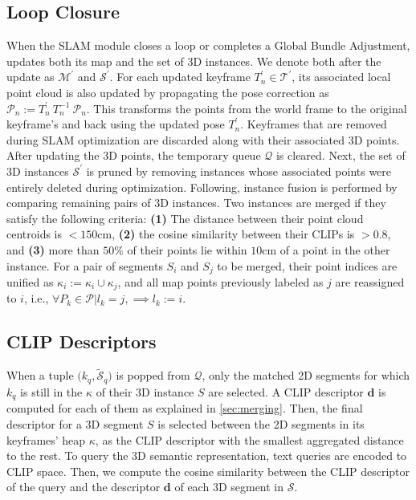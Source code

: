 \subsection{Loop Closure}
\label{sec:loop_closure}
%
When the SLAM module closes a loop or completes a Global Bundle Adjustment, \ours updates both its map and the set of 3D instances. We denote both after the update as \(\mathcal{M}^\prime\) and \(\mathcal{S}^\prime\).
For each updated keyframe \(T_n^\prime\in\mathcal{T}^\prime\), its associated local point cloud is also updated by propagating the pose correction as \(
    \mathcal{P}_{n} := T_{n}^\prime \ T_{n}^{-1} \ \mathcal{P}_n
\). 
This transforms the points from the world frame to the original keyframe's and back using the updated pose \(T_{n}^\prime\).
Keyframes that are removed during SLAM optimization are discarded along with their associated 3D points.
After updating the 3D points, the temporary queue \(\mathcal{Q}\) is cleared. Next, the set of 3D instances \(\mathcal{S}^\prime\) is pruned by removing instances whose associated points were entirely deleted during optimization.
Following, instance fusion is performed by comparing remaining pairs of 3D instances. Two instances are merged if they satisfy the following criteria: \textbf{(1)} The distance between their point cloud centroids is \(<150\)cm, \textbf{(2)} the cosine similarity between their CLIPs is \(>0.8\), and \textbf{(3)} more than \(50\%\) of their points lie within $10$cm of a point in the other instance.
For a pair of segments \(S_i\) and \(S_j\) to be merged, their point indices are unified as \( \kappa_i := \kappa_i \cup \kappa_j \), and all map points previously labeled as \(j\) are reassigned to \(i\), i.e., 
\(\forall P_k \in \mathcal{P} | l_k = j ,\implies l_k := i\).
%
\subsection{CLIP Descriptors
} \label{sec:sem_computation}
%
When a tuple $\big(k_q,\tilde{\mathcal{S}}_q\big)$ is popped from $\mathcal{Q}$, only the matched 2D segments for which $k_q$ is still in the $\kappa$ of their 3D instance $S$ are selected. 
A CLIP descriptor $\mathbf{d}$ is computed for each of them as explained in \cref{sec:merging}. 
Then, the final descriptor for a 3D segment $S$ is selected between the 2D segments in its keyframes' heap $\kappa$, as the CLIP descriptor with the smallest aggregated distance to the rest.
To query the 3D semantic representation, text queries are encoded to CLIP space.
 Then, we compute the cosine similarity between the CLIP descriptor of the query and the descriptor $\mathbf{d}$ of each 3D segment in $\mathcal{S}$. 
%

%
